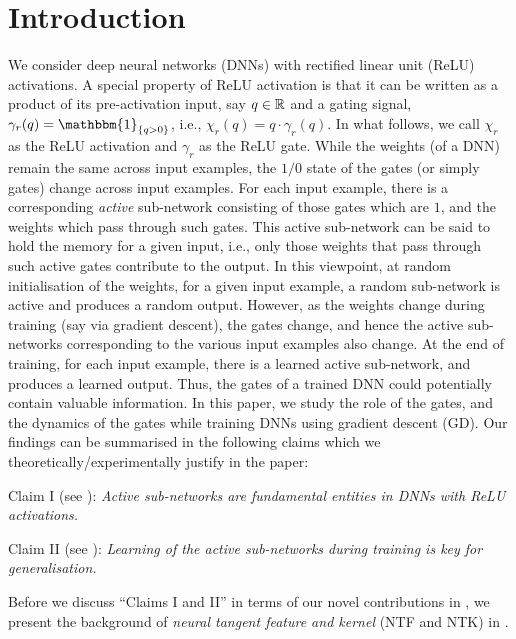 \section{Introduction}
We consider deep neural networks (DNNs) with rectified linear unit (ReLU) activations. A special property of ReLU activation is that it can be written as a product of its pre-activation input, say $q\in\mathbb{R}$ and a gating signal, $\gamma_r(q)=\mathbbm{1}_{\{q>0\}}$, i.e., $\chi_r(q)=q\cdot\gamma_r(q)$. In what follows, we call $\chi_r$ as the ReLU activation and $\gamma_r$ as the ReLU gate.  While the weights (of a DNN) remain the same across input examples, the $1/0$ state of the gates (or simply gates) change across input examples. For each input example, there is a corresponding \emph{active} sub-network consisting of those gates which are $1$, and the weights which pass through such gates. This active sub-network can be said to hold the memory for a given input, i.e., only those weights that pass through such active gates contribute to the output. In this viewpoint, at random initialisation of the weights, for a given input example, a random sub-network is active and produces a random output.  However, as the weights change during training (say via gradient descent), the gates change, and hence the active sub-networks corresponding to the various input examples also change. At the end of training, for each input example, there is a learned active sub-network, and produces a learned output. Thus, the gates of a trained DNN could potentially contain valuable information. In this paper, we study the role of the gates, and the dynamics of the gates while training DNNs  using gradient descent (GD). Our findings can be summarised in the following claims which we theoretically/experimentally justify in the paper:

Claim I  (see ): \emph{Active sub-networks are fundamental entities in DNNs with ReLU activations.}  

Claim II (see ): \emph{Learning of the active sub-networks during training is key for generalisation.}

Before we discuss ``Claims I and II'' in terms of our novel contributions in , we present the background of  \emph{neural tangent feature and kernel} (NTF and NTK) in .


